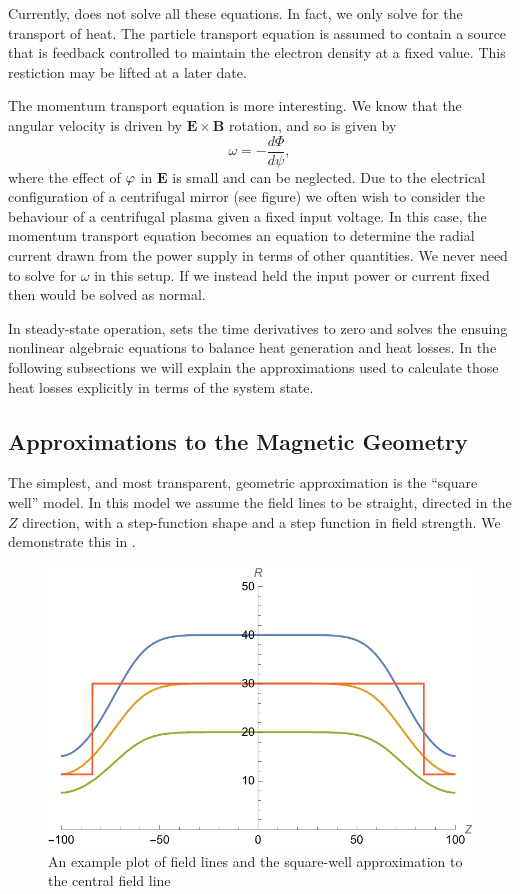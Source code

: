 \documentclass{revtex4-2}
\begin{document}
Currently, \mctrans{} does not solve all these equations. In fact, we only solve for the transport of heat. The particle transport equation is assumed to contain a 
source that is feedback controlled to maintain the electron density at a fixed value. This restiction may be lifted at a later date.

The momentum transport equation is more interesting. We know that the angular velocity is driven by $\bm{E}\times\bm{B}$ rotation, and so is given by
\begin{equation}
\omega = - \frac{d \Phi}{d\psi},
\end{equation}
where the effect of $\varphi$ in $\bm{E}$ is small and can be neglected.  Due to the electrical configuration of a centrifugal mirror (see figure) we often
wish to consider the behaviour of a centrifugal plasma given a fixed input voltage. In this case, the momentum transport equation becomes an equation to determine
the radial current drawn from the power supply in terms of other quantities. We never need to solve  for $\omega$ in this setup. If we instead held the input power or current fixed then  would be solved as normal.

In steady-state operation, \mctrans{} sets the time derivatives to zero and solves the ensuing nonlinear algebraic equations to balance heat generation and heat losses.
In the following subsections we will explain the approximations used to calculate those heat losses explicitly in terms of the system state.

\subsection{Approximations to the Magnetic Geometry}
The simplest, and most transparent, geometric approximation is the ``square well'' model. In this model we assume the field lines to be straight, directed in the $Z$ direction, with a step-function shape and a step function in field strength. We demonstrate this in .
\begin{figure}
\includegraphics{SquareWell.pdf}
\caption{An example plot of field lines and the square-well approximation to the central field line}
\label{squarewellplot}
\end{figure}
\end{document}
